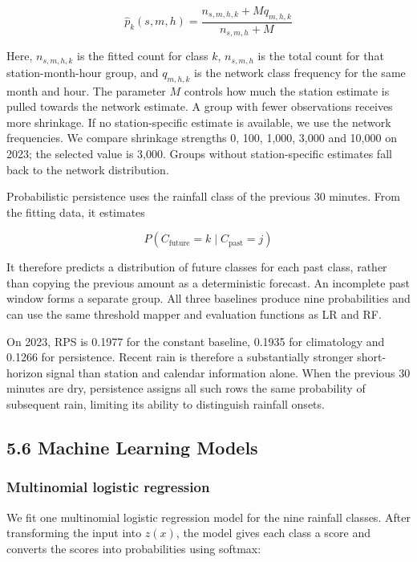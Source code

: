 \documentclass[11pt,a4paper]{article}
\begin{document}
\[
\widehat p_k(s,m,h)=\frac{n_{s,m,h,k}+M q_{m,h,k}}{n_{s,m,h}+M}
\]


Here, \(n_{s,m,h,k}\) is the fitted count for class \(k\), \(n_{s,m,h}\) is the total count for that station-month-hour group, and \(q_{m,h,k}\) is the network class frequency for the same month and hour. The parameter \(M\) controls how much the station estimate is pulled towards the network estimate. A group with fewer observations receives more shrinkage. If no station-specific estimate is available, we use the network frequencies. We compare shrinkage strengths 0, 100, 1,000, 3,000 and 10,000 on 2023; the selected value is 3,000. Groups without station-specific estimates fall back to the network distribution.


Probabilistic persistence uses the rainfall class of the previous 30 minutes. From the fitting data, it estimates


\[
P(C_{\mathrm{future}}=k\mid C_{\mathrm{past}}=j)
\]


It therefore predicts a distribution of future classes for each past class, rather than copying the previous amount as a deterministic forecast. An incomplete past window forms a separate group. All three baselines produce nine probabilities and can use the same threshold mapper and evaluation functions as LR and RF. 


On 2023, RPS is 0.1977 for the constant baseline, 0.1935 for climatology and 0.1266 for persistence. Recent rain is therefore a substantially stronger short-horizon signal than station and calendar information alone. When the previous 30 minutes are dry, persistence assigns all such rows the same probability of subsequent rain, limiting its ability to distinguish rainfall onsets.


\subsection*{5.6 Machine Learning Models}
{}


\subsubsection*{Multinomial logistic regression}
{}


We fit one multinomial logistic regression model for the nine rainfall classes. After transforming the input into \(z(x)\), the model gives each class a score and converts the scores into probabilities using softmax:
\end{document}
